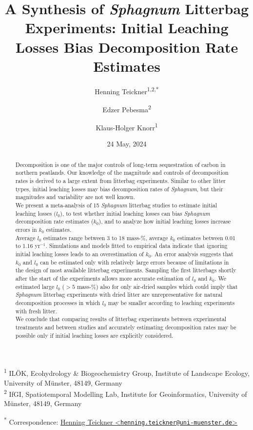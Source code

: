 \documentclass[
  12pt,
]{article}
\title{A Synthesis of \emph{Sphagnum} Litterbag Experiments: Initial Leaching Losses Bias Decomposition Rate Estimates}
\author{Henning Teickner\textsuperscript{1,2,*} \and Edzer Pebesma\textsuperscript{2} \and Klaus-Holger Knorr\textsuperscript{1}}
\date{24 May, 2024}
\begin{document}
\maketitle
\begin{abstract}
Decomposition is one of the major controls of long-term sequestration of carbon in northern peatlands. Our knowledge of the magnitude and controls of decomposition rates is derived to a large extent from litterbag experiments. Similar to other litter types, initial leaching losses may bias decomposition rates of \emph{Sphagnum}, but their magnitudes and variability are not well known.\\
We present a meta-analysis of 15 \emph{Sphagnum} litterbag studies to estimate initial leaching losses (\(l_0\)), to test whether initial leaching losses can bias \emph{Sphagnum} decomposition rate estimates (\(k_0\)), and to analyze how initial leaching losses increase errors in \(k_0\) estimates.\\
Average \(l_0\) estimates range between 3 to 18 mass-\%, average \(k_0\) estimates between 0.01 to 1.16 yr\(^{-1}\). Simulations and models fitted to empirical data indicate that ignoring initial leaching losses leads to an overestimation of \(k_0\). An error analysis suggests that \(k_0\) and \(l_0\) can be estimated only with relatively large errors because of limitations in the design of most available litterbag experiments. Sampling the first litterbags shortly after the start of the experiments allows more accurate estimation of \(l_0\) and \(k_0\). We estimated large \(l_0\) (\(>5\) mass-\%) also for only air-dried samples which could imply that \emph{Sphagnum} litterbag experiments with dried litter are unrepresentative for natural decomposition processes in which \(l_0\) may be smaller according to leaching experiments with fresh litter.\\
We conclude that comparing results of litterbag experiments between experimental treatments and between studies and accurately estimating decomposition rates may be possible only if initial leaching losses are explicitly considered.
\end{abstract}

\textsuperscript{1} ILÖK, Ecohydrology \& Biogeochemistry Group, Institute of Landscape Ecology, University of Münster, 48149, Germany\\
\textsuperscript{2} IfGI, Spatiotemporal Modelling Lab, Institute for Geoinformatics, University of Münster, 48149, Germany

\textsuperscript{*} Correspondence: \href{mailto:henning.teickner@uni-muenster.de}{Henning Teickner \textless{}\href{mailto:henning.teickner@uni-muenster.de}{\nolinkurl{henning.teickner@uni-muenster.de}}\textgreater{}}
\end{document}
